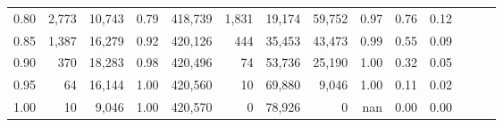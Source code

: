 \begin{tabular}{rrrrrrrrrrrrrr}
0.80 &   2,773 &  10,743 &  0.79 &  418,739 &    1,831 &  19,174 &  59,752 &  0.97 &  0.76 &      0.12 \\
0.85 &   1,387 &  16,279 &  0.92 &  420,126 &      444 &  35,453 &  43,473 &  0.99 &  0.55 &      0.09 \\
0.90 &     370 &  18,283 &  0.98 &  420,496 &       74 &  53,736 &  25,190 &  1.00 &  0.32 &      0.05 \\
0.95 &      64 &  16,144 &  1.00 &  420,560 &       10 &  69,880 &   9,046 &  1.00 &  0.11 &      0.02 \\
1.00 &      10 &   9,046 &  1.00 &  420,570 &        0 &  78,926 &       0 &   nan &  0.00 &      0.00 \\
\bottomrule
\end{tabular}
